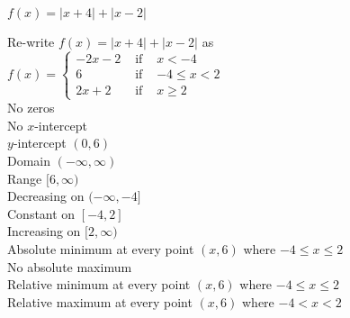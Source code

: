 {$f(x) = |x + 4| + |x - 2|$}
{Re-write $f(x) = |x + 4| + |x - 2|$ as \\ ${\displaystyle f(x) = \left\{ \begin{array}{rcl}
-2x - 2 & \mbox{ if } & x < -4\\
      6 & \mbox{ if } & -4 \leq x < 2\\
 2x + 2 & \mbox{ if } & x \geq 2  \end{array} \right. }$ \\ No zeros \\ No $x$-intercept \\ $y$-intercept $(0, 6)$ \\ Domain $(-\infty, \infty)$ \\ Range $[6, \infty)$ \\ Decreasing on $(-\infty, -4]$ \\ Constant on $[-4, 2]$ \\ Increasing on $[2, \infty)$ \\  Absolute minimum at every point $(x, 6)$ where $-4 \leq x \leq 2$ \\ No absolute maximum \\ Relative minimum at every point $(x, 6)$ where $-4 \leq x \leq 2$ \\ Relative maximum at every point $(x, 6)$ where $-4 < x < 2$ 

\begin{center}
\end{center}}